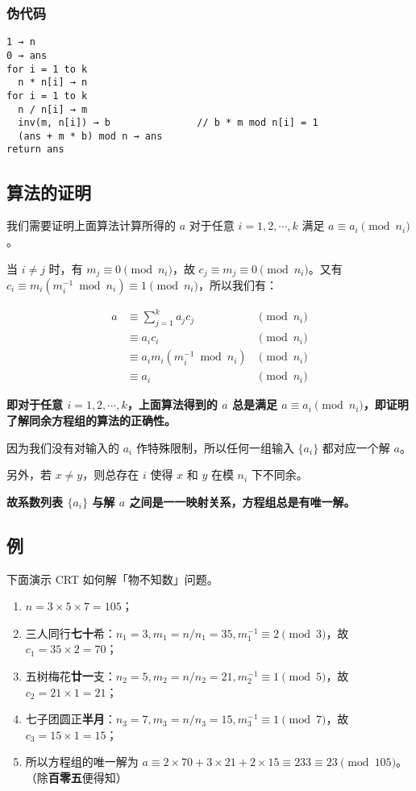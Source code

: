 \subsubsection{伪代码}

\begin{verbatim}
1 → n
0 → ans
for i = 1 to k
  n * n[i] → n
for i = 1 to k
  n / n[i] → m
  inv(m, n[i]) → b               // b * m mod n[i] = 1
  (ans + m * b) mod n → ans
return ans
\end{verbatim}

\subsection{算法的证明}

我们需要证明上面算法计算所得的 $a$ 对于任意 $i=1,2,\cdots,k$ 满足 $a\equiv a_i \pmod {n_i}$。

当 $i\neq j$ 时，有 $m_j\equiv 0 \pmod {n_i}$，故 $c_j\equiv m_j\equiv 0 \pmod {n_i}$。又有 $c_i\equiv m_i(m_i^{-1}\bmod {n_i})\equiv 1 \pmod {n_i}$，所以我们有：

$$
\begin{aligned}
a&\equiv \sum_{j=1}^k a_jc_j        &\pmod {n_i} \\
 &\equiv a_ic_i                     &\pmod {n_i} \\
 &\equiv a_im_i(m^{-1}_i \bmod n_i) &\pmod {n_i} \\
 &\equiv a_i                        &\pmod {n_i}
\end{aligned}
$$

\textbf{即对于任意 $i=1,2,\cdots,k$，上面算法得到的 $a$ 总是满足 $a\equiv a_i \pmod{n_i}$，即证明了解同余方程组的算法的正确性。}

因为我们没有对输入的 $a_i$ 作特殊限制，所以任何一组输入 $\{a_i\}$ 都对应一个解 $a$。

另外，若 $x\neq y$，则总存在 $i$ 使得 $x$ 和 $y$ 在模 $n_i$ 下不同余。

\textbf{故系数列表 $\{a_i\}$ 与解 $a$ 之间是一一映射关系，方程组总是有唯一解。}

\subsection{例}

下面演示 CRT 如何解「物不知数」问题。

\begin{enumerate}
\item $n=3\times 5\times 7=105$；
\item 三人同行\textbf{七十}希：$n_1=3, m_1=n/n_1=35, m_1^{-1}\equiv 2\pmod 3$，故 $c_1=35\times 2=70$；
\item 五树梅花\textbf{廿一}支：$n_2=5, m_2=n/n_2=21, m_2^{-1}\equiv 1\pmod 5$，故 $c_2=21\times 1=21$；
\item 七子团圆正\textbf{半月}：$n_3=7, m_3=n/n_3=15, m_3^{-1}\equiv 1\pmod 7$，故 $c_3=15\times 1=15$；
\item 所以方程组的唯一解为 $a\equiv 2\times 70+3\times 21+2\times 15\equiv 233\equiv 23 \pmod {105}$。（除\textbf{百零五}便得知）
\end{enumerate}

